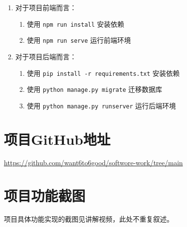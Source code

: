 \documentclass[UTF8,a4paper,10pt]{ctexart}
\begin{document}
\begin{enumerate}
    \item 对于项目前端而言：
    \begin{enumerate}
        \item 使用 \texttt{npm run install} 安装依赖
        \item 使用 \texttt{npm run serve} 运行前端环境
    \end{enumerate}
    \item 对于项目后端而言：
    \begin{enumerate}
        \item 使用 \texttt{pip install -r requirements.txt} 安装依赖
        \item 使用 \texttt{python manage.py migrate} 迁移数据库
        \item 使用 \texttt{python manage.py runserver} 运行后端环境
    \end{enumerate}
\end{enumerate}


\section{项目GitHub地址}

\url{https://github.com/want6to6good/softwore-work/tree/main}

\section{项目功能截图}

项目具体功能实现的截图见讲解视频，此处不重复叙述。
\end{document}
